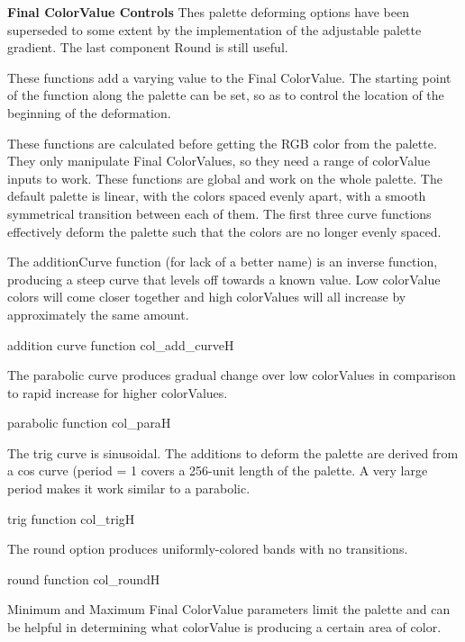 \textbf{Final ColorValue Controls}
Thes palette deforming options have been superseded to some extent by the implementation of the adjustable palette gradient. The last component Round is still useful.

These functions add a varying value to the Final ColorValue. The starting point of the function along the palette can be set, so as to control the location of the beginning of the deformation.

These functions are calculated before getting the RGB color from the palette. They only manipulate Final ColorValues, so they need a range of colorValue inputs to work. These functions are global and work on the whole palette. The default palette is linear, with the colors spaced evenly apart, with a smooth symmetrical transition between each of them. The first three curve functions effectively deform the palette such that the colors are no longer evenly spaced.

The additionCurve function (for lack of a better name) is an inverse function, producing a steep curve that levels off towards a known value. Low colorValue colors will come closer together and high colorValues will all increase by approximately the same amount.

{addition curve function}
{col_add_curve}{H}

The parabolic curve produces gradual change over low colorValues in comparison to rapid increase for higher colorValues.

{parabolic function}
{col_para}{H}

The trig curve is sinusoidal. The additions to deform the palette are derived from a cos curve (period = 1 covers a 256-unit length of the palette. A very large period makes it work similar to a parabolic.

{trig function}
{col_trig}{H}

The round option produces uniformly-colored bands with no transitions.

{round function}
{col_round}{H}

Minimum and Maximum Final ColorValue parameters limit the palette and can be helpful in determining what colorValue is producing a certain area of color.







